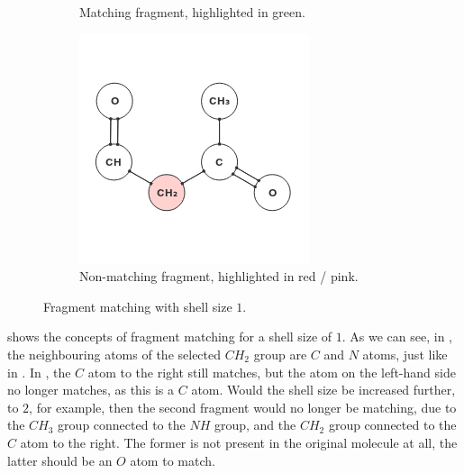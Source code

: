 \begin{figure}
\begin{subfigure}[t]{0.29\textwidth}
\caption{Matching fragment, highlighted in green.}
\end{subfigure}%
\qquad
\begin{subfigure}[t]{0.29\textwidth}
\centering
\includegraphics[width=\textwidth]{img/shell_3.png}
\caption{Non-matching fragment, highlighted in red / pink.}
\end{subfigure}
\caption{Fragment matching with shell size $1$.}
\end{figure}

 shows the concepts of fragment matching for a shell size of $1$. As we can see, in , the neighbouring atoms of the selected $CH_{2}$ group are $C$ and $N$ atoms, just like in . In , the $C$ atom to the right still matches, but the atom on the left-hand side no longer matches, as this is a $C$ atom. Would the shell size be increased further, to $2$, for example, then the second fragment would no longer be matching, due to the $CH_{3}$ group connected to the $NH$ group, and the $CH_{2}$ group connected to the $C$ atom to the right. The former is not present in the original molecule at all, the latter should be an $O$ atom to match.


